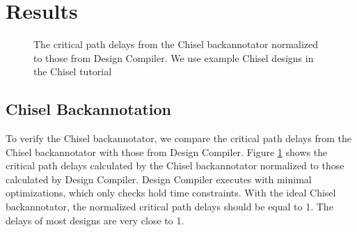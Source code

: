 \section{Results}
\begin{figure}
	\centering
    \caption{The critical path delays from the Chisel backannotator normalized to those from Design Compiler. We use example Chisel designs in the Chisel tutorial}
	\label{fig:backannotation_result}
\end{figure}
\subsection{Chisel Backannotation}
To verify the Chisel backannotator, we compare the critical path delays from the Chisel backannotator with those from Design Compiler. Figure \ref{fig:backannotation_result} shows the critical path delays calculated by the Chisel backannotator normalized to those calculated by Design Compiler. Design Compiler executes with minimal optimizations, which only checks hold time constraints. With the ideal Chisel backannotator, the normalized critical path delays should be equal to 1. The delays of most designs are very close to 1.

